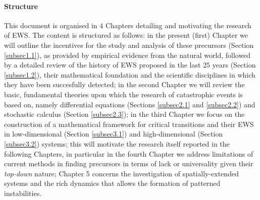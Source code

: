 \documentclass[../main.tex]{subfiles}
\begin{document}
\paragraph{Structure}
This document is organised in $4$ Chapters detailing and motivating the research of EWS. 
The content is structured as follows: in the present (first) Chapter we will outline the incentives for the study and analysis of these precursors (Section \ref{subsec1.1}), as provided by empirical evidence from the natural world, followed by a detailed review of the history of EWS proposed in the last $25$ years (Section \ref{subsec1.2}), their mathematical foundation and the scientific disciplines in which they have been succesfully detected; 
in the second Chapter we will review the basic, fundamental theories upon which the research of catastrophic events is based on, namely differential equations (Sections \ref{subsec2.1} and \ref{subsec2.2}) and stochastic calculus (Section \ref{subsec2.3});
in the third Chapter we focus on the construction of a mathematical framework for critical transitions and their EWS in low-dimensional (Section \ref{subsec3.1}) and high-dimensional (Section \ref{subsec3.2}) systems; 
this will motivate the research itself reported in the following Chapters, in particular in the fourth Chapter we address limitations of current methods in finding precursors in terms of lack or universality given their \textit{top-down} nature;
Chapter 5 concerns the investigation of spatially-extended systems and the rich dynamics that allows the formation of patterned instabilities.
\end{document}
